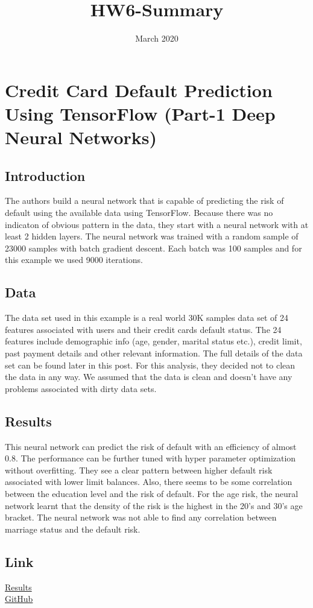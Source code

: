 \documentclass{article}
\title{HW6-Summary}
\date{March 2020}
\begin{document}
\maketitle

\section{Credit Card Default Prediction Using TensorFlow (Part-1 Deep Neural Networks)}
\subsection{Introduction}
The authors build a neural network that is capable of predicting the risk of default using the available data using TensorFlow. Because there was no indicaton of obvious pattern in the data, they start with a neural network with at least 2 hidden layers. 
The neural network was trained with a random sample of 23000 samples with batch gradient descent. Each batch was 100 samples and for this example we used 9000 iterations.
\subsection{Data}
The data set used in this example is a real world 30K samples data set of 24 features associated with users and their credit cards default status. The 24 features include demographic info (age, gender, marital status etc.), credit limit, past payment details and other relevant information. The full details of the data set can be found later in this post.
For this analysis, they decided not to clean the data in any way. We assumed that the data is clean and doesn’t have any problems associated with dirty data sets.
\subsection{Results}
This neural network can predict the risk of default with an efficiency of almost 0.8. The performance can be further tuned with hyper parameter optimization without overfitting. They see a clear pattern between higher default risk associated with lower limit balances. Also, there seems to be some correlation between the education level and the risk of default. For the age risk, the neural network learnt that the density of the risk is the highest in the 20’s and 30’s age bracket. The neural network was not able to find any correlation between marriage status and the default risk.
\subsection{Link}
\href{https://medium.com/@Saadism/credit-card-default-prediction-using-tensorflow-part-1-deep-neural-networks-ef22cfd4d278}{Results}\\
\href{https://github.com/syedhussain76/deepshield}{GitHub}
\end{document}
